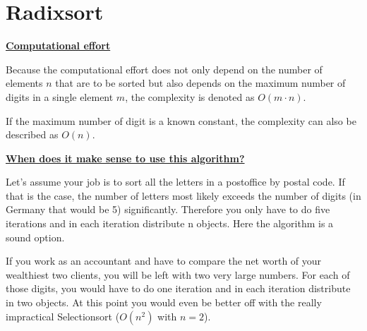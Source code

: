 \documentclass[a4paper]{report}
\begin{document}
\chapter*{Radixsort}

\underline{\bf{Computational effort}}

Because the computational effort does not only depend on the number of elements $n$ that are to be sorted but also depends on the maximum number of digits in a single element $m$, the complexity is denoted as $O(m \cdot n)$.

If the maximum number of digit is a known constant, the complexity can also be described as $O(n)$.

\underline{\bf{When does it make sense to use this algorithm?}}

Let's assume your job is to sort all the letters in a postoffice by postal code. If that is the case, the number of letters most likely exceeds the number of digits (in Germany that would be 5) significantly. Therefore you only have to do five iterations and in each iteration distribute n objects. Here the algorithm is a sound option.

If you work as an accountant and have to compare the net worth of your wealthiest two clients, you will be left with two very large numbers. For each of those digits, you would have to do one iteration and in each iteration distribute in two objects. At this point you would even be better off with the really impractical Selectionsort ($O(n^2)$ with $n=2$).
\end{document}

